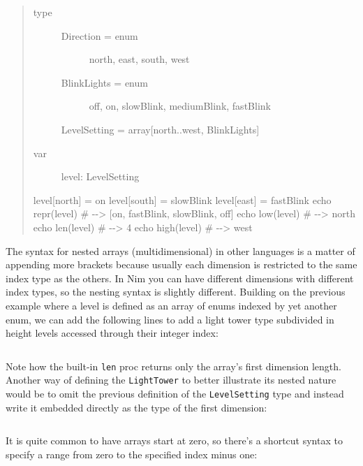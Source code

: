 \begin{verbatim}
\end{verbatim}

\begin{quote}
\begin{description}
\item[type]
\begin{description}
\item[Direction = enum]
north, east, south, west
\item[BlinkLights = enum]
off, on, slowBlink, mediumBlink, fastBlink
\end{description}

LevelSetting = array{[}north..west, BlinkLights{]}
\item[var]
level: LevelSetting
\end{description}

level{[}north{]} = on level{[}south{]} = slowBlink level{[}east{]} =
fastBlink echo repr(level) \# -\/-\textgreater{} {[}on, fastBlink,
slowBlink, off{]} echo low(level) \# -\/-\textgreater{} north echo
len(level) \# -\/-\textgreater{} 4 echo high(level) \#
-\/-\textgreater{} west
\end{quote}

The syntax for nested arrays (multidimensional) in other languages is a
matter of appending more brackets because usually each dimension is
restricted to the same index type as the others. In Nim you can have
different dimensions with different index types, so the nesting syntax
is slightly different. Building on the previous example where a level is
defined as an array of enums indexed by yet another enum, we can add the
following lines to add a light tower type subdivided in height levels
accessed through their integer index:

\begin{verbatim}
\end{verbatim}

Note how the built-in \texttt{len} proc returns only the array's first
dimension length. Another way of defining the \texttt{LightTower} to
better illustrate its nested nature would be to omit the previous
definition of the \texttt{LevelSetting} type and instead write it
embedded directly as the type of the first dimension:

\begin{verbatim}
\end{verbatim}

It is quite common to have arrays start at zero, so there's a shortcut
syntax to specify a range from zero to the specified index minus one:


